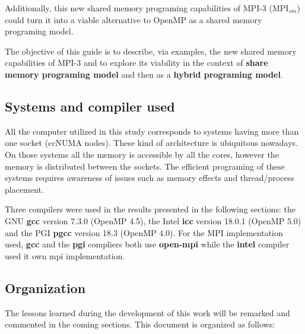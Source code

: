 Additionally, this new shared memory programing capabilities of MPI-3 (MPI$_{sm}$) could turn it into a viable alternative to OpenMP as a shared memory programing model.
 
\medskip


The objective of this guide is to describe, via examples, the new shared memory capabilities of MPI-3 and to explore its viability in the context of \textbf{share memory programing model} and then as a \textbf{hybrid programing model}.


\subsection*{Systems and compiler used}

All the computer utilized in this study corresponds to systems having more than one socket (ccNUMA nodes). These kind of architecture is ubiquitous nowadays. On those systems all the memory is accessible by all the cores, however the memory is distributed between the sockets. The efficient programing of these systems requires awareness of issues such as memory effects and thread/process placement.


Three compilers were used in the results presented in the following sections: the GNU \textbf{gcc}  version 7.3.0 (OpenMP 4.5), the Intel \textbf{icc} version 18.0.1 (OpenMP 5.0) and the  PGI \textbf{pgcc} version 18.3 (OpenMP 4.0). For the MPI implementation used, \textbf{gcc} and the \textbf{pgi} compliers both use \textbf{open-mpi} while the \textbf{intel} compiler used it own mpi implementation.



\subsection*{Organization}


\medskip

The lessons learned during the development of this work will be remarked and commented in the coming sections. This document is organized as follows:

